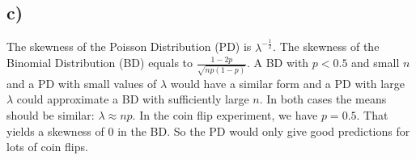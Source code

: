 \documentclass[11pt,a4paper]{article}
\begin{document}
\subsection*{c)}
The skewness of the Poisson Distribution (PD) is $\lambda^{-\frac{1}{2}}$. The skewness of the Binomial Distribution (BD) equals
to $\frac{1-2p}{\sqrt{np(1-p)}}$. A BD with $p<0.5$ and small $n$ and a PD with small values of $\lambda$ would have a similar
form and a PD with large $\lambda$ could approximate a BD with sufficiently large $n$. In both cases the means should be similar:
$\lambda \approx np$. In the coin flip experiment, we have $p=0.5$. That yields a skewness of 0 in the BD. So the PD would only
give good predictions for lots of coin flips.
\end{document}
